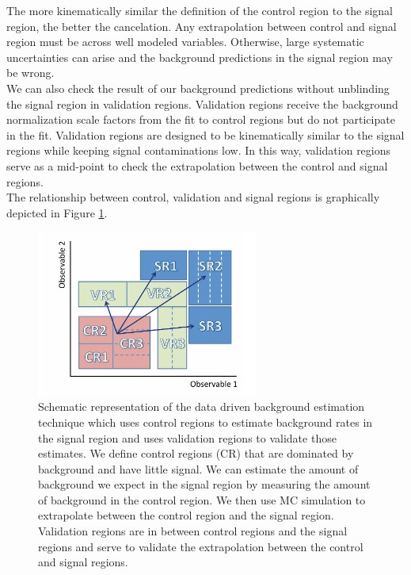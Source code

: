 \indent The more kinematically similar the definition of the control region to the signal region, the better the cancelation.  Any extrapolation between control and signal region must be across well modeled variables.  Otherwise, large systematic uncertainties can arise and the background predictions in the signal region may be wrong.  \\

\indent We can also check the result of our background predictions without unblinding the signal region in validation regions.  Validation regions receive the background normalization scale factors from the fit to control regions but do not participate in the fit.   Validation regions are designed to be kinematically similar to the signal regions while keeping signal contaminations low.  In this way, validation regions serve as a mid-point to check the extrapolation between the control and signal regions.  \\

\indent The relationship between control, validation and signal regions is graphically depicted in Figure \ref{fig:CR_VR_SR_stat}. \\

\begin{figure}[h!]
  \centering
	\includegraphics[width=0.65\textwidth]{./figures/statistics/CR_VR_SR.pdf}
\caption[Schematic representation of the relationship between control, validation and signal regions]{Schematic representation of the data driven background estimation technique which uses control regions to estimate background rates in the signal region and uses validation regions to validate those estimates.  We define control regions (CR) that are dominated by background and have little signal.  We can estimate the amount of background we expect in the signal region by measuring the amount of background in the control region.  We then use MC simulation to extrapolate between the control region and the signal region. Validation regions are in between control regions and the signal regions and serve to validate the extrapolation between the control and signal regions.  }
\label{fig:CR_VR_SR_stat}
\end{figure}

